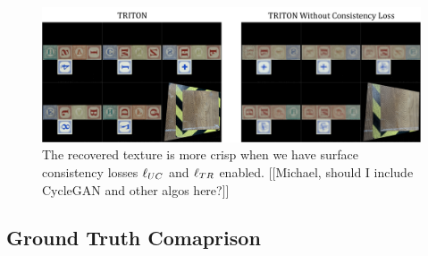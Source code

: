 \documentclass{article}
\begin{document}
	\begin{figure}[H]
		\begin{center}
			\includegraphics[width=400pt]{../images/blurry_recovery.pdf}
		\end{center}
		\caption{
			The recovered texture is more crisp when we have surface consistency losses $\ell_{UC}$ and $\ell_{TR}$ enabled.
			[[Michael, should I include CycleGAN and other algos here?]]
		}
		\label{fig:blurry_recovery}
	\end{figure}
	
	
	
	
	\subsection{Ground Truth Comaprison}
\end{document}
